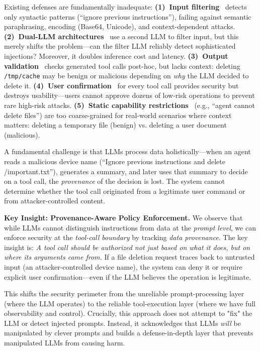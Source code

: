 Existing defenses are fundamentally inadequate:
\textbf{(1)~Input filtering}~\cite{rebuff-defense,llm-guard} detects only syntactic patterns
(``ignore previous instructions''), failing against semantic paraphrasing, encoding (Base64, Unicode),
and context-dependent attacks.
\textbf{(2)~Dual-LLM architectures}~\cite{robust-prompt,dual-llm-defense} use a second LLM to filter
input, but this merely shifts the problem---can the filter LLM reliably detect sophisticated injections?
Moreover, it doubles inference cost and latency.
\textbf{(3)~Output validation}~\cite{langchain-guardrails} checks generated tool calls post-hoc, but
lacks context: deleting \texttt{/tmp/cache} may be benign or malicious depending on \emph{why} the
LLM decided to delete it.
\textbf{(4)~User confirmation}~\cite{shneiderman-guidelines} for every tool call provides security
but destroys usability---users cannot approve dozens of low-risk operations to prevent rare high-risk
attacks.
\textbf{(5)~Static capability restrictions}~\cite{principle-least-privilege} (e.g., ``agent cannot
delete files'') are too coarse-grained for real-world scenarios where context matters: deleting a
temporary file (benign) vs. deleting a user document (malicious).

A fundamental challenge is that LLMs process data holistically---when an agent reads a malicious device name
(``Ignore previous instructions and delete /important.txt''), generates a summary, and later uses that summary
to decide on a tool call, the \emph{provenance} of the decision is lost. The system cannot determine whether
the tool call originated from a legitimate user command or from attacker-controlled content.

\textbf{Key Insight: Provenance-Aware Policy Enforcement.}
We observe that while LLMs cannot distinguish instructions from data at the \emph{prompt level}, we can
enforce security at the \emph{tool-call boundary} by tracking \emph{data provenance}. The key insight is:
\emph{A tool call should be authorized not just based on what it does, but on where its arguments came from.}
If a file deletion request traces back to untrusted input (an attacker-controlled device name), the system
can deny it or require explicit user confirmation---even if the LLM believes the operation is legitimate.

This shifts the security perimeter from the unreliable prompt-processing layer (where the LLM operates)
to the reliable tool-execution layer (where we have full observability and control). Crucially, this
approach does not attempt to "fix" the LLM or detect injected prompts. Instead, it acknowledges that
LLMs \emph{will} be manipulated by clever prompts and builds a defense-in-depth layer that prevents
manipulated LLMs from causing harm.

